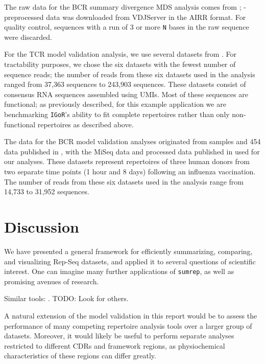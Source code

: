 \documentclass{article}
\newcommand{\igor}{\texttt{IGoR}}
\newcommand{\igblast}{\text{IgBlast}}
\begin{document}
The raw data for the BCR summary divergence MDS analysis comes from \cite{Rubelt2016-tl}; \igblast-preprocessed data was downloaded from VDJServer in the AIRR format.
For quality control, sequences with a run of 3 or more \texttt{N} bases in the raw sequence were discarded.

For the TCR model validation analysis, we use several datasets from \cite{Britanova2016-iw}.
For tractability purposes, we chose the six datasets with the fewest number of sequence reads; the number of reads from these six datasets used in the analysis ranged from 37,363 sequences to 243,903 sequences.
These datasets consist of consensus RNA sequences assembled using UMIs.
Most of these sequences are functional; as previously described, for this example application we are benchmarking \igor's ability to fit complete repertoires rather than only non-functional repertoires as described above.

The data for the BCR model validation analyses originated from samples and 454 data published in \cite{Laserson2014-dx}, with the MiSeq data and processed data published in \cite{Gupta2017-ve} used for our analyses.
These datasets represent repertoires of three human donors from two separate time points (1 hour and 8 days) following an influenza vaccination.
The number of reads from these six datasets used in the analysis range from 14,733 to 31,952 sequences.




\section*{Discussion}
We have presented a general framework for efficiently summarizing, comparing, and visualizing Rep-Seq datasets, and applied it to several questions of scientific interest.
One can imagine many further applications of \texttt{sumrep}, as well as promising avenues of research.

Similar tools: \cite{Nazarov2015-ok,Shugay2015-ur}.
TODO: Look for others.

A natural extension of the model validation in this report would be to assess the performance of many competing repertoire analysis tools over a larger group of datasets.
Moreover, it would likely be useful to perform separate analyses restricted to different CDRs and framework regions, as physiochemical characteristics of these regions can differ greatly.
\end{document}
